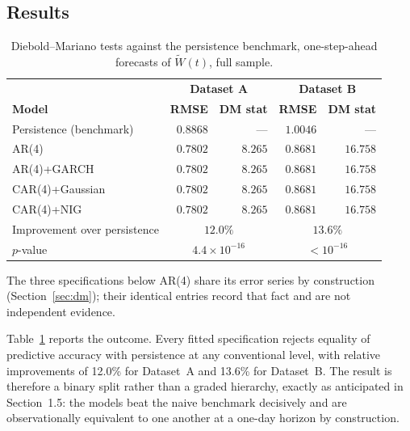 \documentclass[11pt, a4paper, twoside]{article}
\begin{document}
\subsection{Results}
\label{sec:dm-results}

\begin{table}[htbp]
\centering
\caption{Diebold--Mariano tests against the persistence benchmark, one-step-ahead forecasts of $\widetilde W(t)$, full sample.}
\label{tab:dm}
\begin{tabular}{l r r r r}
\toprule
& \multicolumn{2}{c}{\textbf{Dataset A}} & \multicolumn{2}{c}{\textbf{Dataset B}} \\
\textbf{Model} & \textbf{RMSE} & \textbf{DM stat} & \textbf{RMSE} & \textbf{DM stat} \\
\midrule
Persistence (benchmark) & $0.8868$ & --- & $1.0046$ & --- \\
AR(4) & $0.7802$ & $8.265$ & $0.8681$ & $16.758$ \\
AR(4)+GARCH & $0.7802$ & $8.265$ & $0.8681$ & $16.758$ \\
CAR(4)+Gaussian & $0.7802$ & $8.265$ & $0.8681$ & $16.758$ \\
CAR(4)+NIG & $0.7802$ & $8.265$ & $0.8681$ & $16.758$ \\
\midrule
Improvement over persistence & \multicolumn{2}{c}{$12.0\%$} & \multicolumn{2}{c}{$13.6\%$} \\
$p$-value & \multicolumn{2}{c}{$4.4\times10^{-16}$} & \multicolumn{2}{c}{$<10^{-16}$} \\
\bottomrule
\end{tabular}
\par\vspace{4pt}
\begin{minipage}{0.92\textwidth}
\footnotesize The three specifications below AR(4) share its error series by construction (Section~\ref{sec:dm}); their identical entries record that fact and are not independent evidence.
\end{minipage}
\end{table}

Table~\ref{tab:dm} reports the outcome. Every fitted specification rejects equality of predictive accuracy with persistence at any conventional level, with relative improvements of 12.0\% for Dataset~A and 13.6\% for Dataset~B. The result is therefore a binary split rather than a graded hierarchy, exactly as anticipated in Section~1.5: the models beat the naive benchmark decisively and are observationally equivalent to one another at a one-day horizon by construction.
\end{document}
